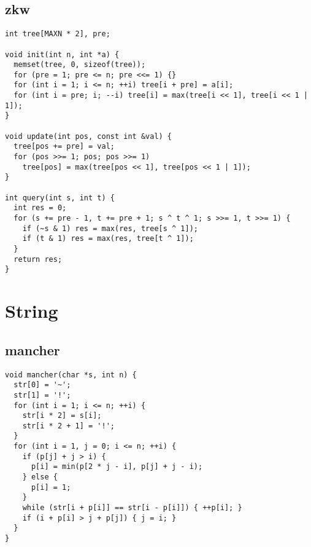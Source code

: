 \documentclass[twoside]{article}
\begin{document}
\subsection{zkw}
\begin{lstlisting}
int tree[MAXN * 2], pre;

void init(int n, int *a) {
  memset(tree, 0, sizeof(tree));
  for (pre = 1; pre <= n; pre <<= 1) {}
  for (int i = 1; i <= n; ++i) tree[i + pre] = a[i];
  for (int i = pre; i; --i) tree[i] = max(tree[i << 1], tree[i << 1 | 1]);
}

void update(int pos, const int &val) {
  tree[pos += pre] = val;
  for (pos >>= 1; pos; pos >>= 1)
    tree[pos] = max(tree[pos << 1], tree[pos << 1 | 1]);
}

int query(int s, int t) {
  int res = 0;
  for (s += pre - 1, t += pre + 1; s ^ t ^ 1; s >>= 1, t >>= 1) {
    if (~s & 1) res = max(res, tree[s ^ 1]);
    if (t & 1) res = max(res, tree[t ^ 1]);
  }
  return res;
}

\end{lstlisting}

\section{String}

\subsection{mancher}
\begin{lstlisting}
void mancher(char *s, int n) {
  str[0] = '~';
  str[1] = '!';
  for (int i = 1; i <= n; ++i) {
    str[i * 2] = s[i];
    str[i * 2 + 1] = '!';
  }
  for (int i = 1, j = 0; i <= n; ++i) {
    if (p[j] + j > i) {
      p[i] = min(p[2 * j - i], p[j] + j - i);
    } else {
      p[i] = 1;
    }
    while (str[i + p[i]] == str[i - p[i]]) { ++p[i]; }
    if (i + p[i] > j + p[j]) { j = i; }
  }
}

\end{lstlisting}
\end{document}
